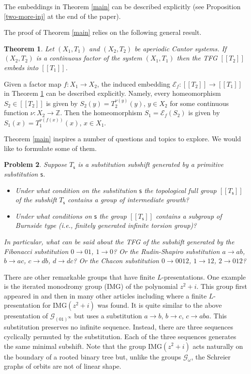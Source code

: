 \documentclass[12pt]{article}
\newtheorem{theorem}{Theorem}[section]
\newtheorem{problem}[theorem]{Problem}
\theoremstyle{definition}
\def\bZ{\mathbb{Z}}
\def\cG{\mathcal{G}}
\def\om{\omega}
\def\subst{\mathsf{s}}
\begin{document}
The embeddings in Theorem \ref{main} can be described explicitly (see 
Proposition \ref{two-more-inj} at the end of the paper).

The proof of Theorem \ref{main} relies on the following general result.

\begin{theorem}\label{main0}
Let $(X_1,T_1)$ and $(X_2,T_2)$ be aperiodic Cantor systems.  If 
$(X_2,T_2)$ is a continuous factor of the system $(X_1,T_1)$ then the TFG 
$[[T_2]]$ embeds into $[[T_1]]$.
\end{theorem}

Given a factor map $f:X_1\to X_2$, the induced embedding 
$\mathcal{E}_f:[[T_2]]\to[[T_1]]$ in Theorem \ref{main0} can 
be described explicitly.  Namely, every homeomorphism $S_2\in[[T_2]]$ is 
given by $S_2(y)=T_2^{\nu(y)}(y)$, $y\in X_2$ for some continuous function 
$\nu:X_2\to\bZ$.  Then the homeomorphism $S_1=\mathcal{E}_f(S_2)$ is given 
by $S_1(x)=T_1^{\nu(f(x))}(x)$, $x\in X_1$.

Theorem \ref{main} inspires a number of questions and topics to explore.  
We would like to formulate some of them.

\begin{problem}
Suppose $T_{\subst}$ is a substitution subshift generated by a primitive 
substitution $\subst$.
\begin{itemize}
\item[(i)]
Under what condition on the substitution $\subst$ the topological full  
group $[[T_{\subst}]]$ of the subshift $T_{\subst}$ contains a group of 
intermediate growth?
\item[(ii)]
Under what conditions on $\subst$ the group $[[T_{\subst}]]$ contains a 
subgroup of Burnside type (i.e., finitely generated infinite torsion group)?
\end{itemize}
In particular, what can be said about the TFG of the subshift generated by 
the Fibonacci substitution $0\to01$, $1\to0$?  Or the Rudin-Shapiro 
substitution $a\to ab$, $b\to ac$, $c\to db$, $d\to dc$?  Or the Chacon 
substitution $0\to 0012$, $1\to 12$, $2\to 012$?
\end{problem}

There are other remarkable groups that have finite $L$-presentations.  One 
example is the iterated monodromy group (IMG) of the polynomial $z^2+i$.  
This group first appeared in \cite{BarGrigNek} and then in many other 
articles including \cite{GrigSavSun} where a finite $L$-presentation for  
$\mathrm{IMG}(z^2+i)$ was found.  It is quite similar to the above 
presentation of $\cG_{(01)^\infty}$ but uses a substitution $a\to b$, $b\to 
c$, $c\to aba$.  This substitution preserves no infinite sequence.  
Instead, there are three sequences cyclically permuted by the 
substitution.  Each of the three sequences generates the same minimal 
subshift.  Note that the group $\mathrm{IMG}(z^2+i)$ acts naturally on the 
boundary of a rooted binary tree but, unlike the groups $\cG_\om$, the 
Schreier graphs of orbits are not of linear shape.
\end{document}
